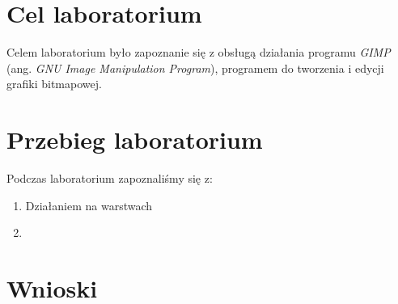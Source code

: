 \documentclass{article}
\begin{document}

\newpage
\section{Cel laboratorium}
Celem laboratorium było zapoznanie się z obsługą działania programu \emph{GIMP} (ang. \textit{GNU Image Manipulation Program}), programem do tworzenia i edycji grafiki bitmapowej.
\section{Przebieg laboratorium}

Podczas laboratorium zapoznaliśmy się z:
\begin{enumerate}[)]
\item Działaniem na warstwach
\item 
\end{enumerate}


\section{Wnioski}
\end{document}
